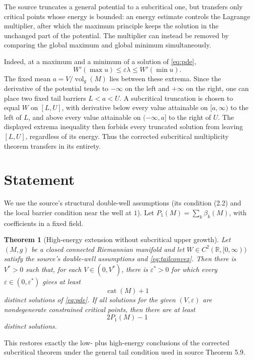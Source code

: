 \documentclass[11pt]{article}
\newtheorem{theorem}{Theorem}
\newcommand{\vol}{\operatorname{vol}}
\newcommand{\cat}{\operatorname{cat}}
\begin{document}
The source truncates a general potential to a subcritical one, but transfers
only critical points whose energy is bounded: an energy estimate controls the
Lagrange multiplier, after which the maximum principle keeps the solution in
the unchanged part of the potential.  The multiplier can instead be removed
by comparing the global maximum and global minimum simultaneously.

Indeed, at a maximum and a minimum of a solution of \eqref{eq:pde},
\[
 W'(\max u)\le \varepsilon\lambda\le W'(\min u).
\]
The fixed mean $a=V/\vol_g(M)$ lies between these extrema.  Since the derivative
of the potential tends to $-\infty$ on the left and $+\infty$ on the right,
one can place two fixed tail barriers $L<a<U$.  A subcritical truncation is
chosen to equal $W$ on $[L,U]$, with derivative below every value attainable
on $[a,\infty)$ to the left of $L$, and above every value attainable on
$(-\infty,a]$ to the right of $U$.  The displayed extrema inequality then
forbids every truncated solution from leaving $[L,U]$, regardless of its
energy.  Thus the corrected subcritical multiplicity theorem transfers in its
entirety.

\section{Statement}

We use the source's structural double-well assumptions (its condition (2.2)
and the local barrier condition near the well at $1$).  Let
$P_1(M)=\sum_k\beta_k(M)$, with coefficients in a fixed field.

\begin{theorem}[High-energy extension without subcritical upper growth]
\label{thm:main}
Let $(M,g)$ be a closed connected Riemannian manifold and let
$W\in C^2(\mathbb R,[0,\infty))$ satisfy the source's double-well assumptions
and \eqref{eq:tailconvex}.  Then there is $V^*>0$ such that, for each
$V\in(0,V^*)$, there is $\varepsilon^*>0$ for which every
$\varepsilon\in(0,\varepsilon^*)$ gives at least
\[
 \cat(M)+1
\]
distinct solutions of \eqref{eq:pde}.  If all solutions for the given
$(V,\varepsilon)$ are nondegenerate constrained critical points, then there
are at least
\[
 2P_1(M)-1
\]
distinct solutions.
\end{theorem}

This restores exactly the low- plus high-energy conclusions of the corrected
subcritical theorem under the general tail condition used in source
Theorem 5.9.
\end{document}
